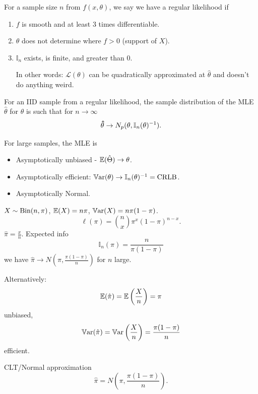 \documentclass[10pt, a4paper]{article}
\begin{document}
\begin{definition}
    For a sample size $n$ from $f(x, \theta)$,
    we say we have a regular likelihood if
    \begin{enumerate}[label = (\roman*)]
        \item $f$ is smooth and at least $3$ times differentiable.

        \item $\theta$ does not determine where $f > 0$
        (support of $X$).

        \item $\mathbb{I}_n$ exists,
        is finite,
        and greater than $0$.

        In other words:
        $\mathcal{L}(\theta)$ can be quadratically approximated at $\hat{\theta}$ and doesn't do anything weird.
    \end{enumerate}
\end{definition}

\begin{proposition}
    For an IID sample from a regular likelihood,
    the sample distribution of the MLE $\hat{\theta}$ for $\theta$ is such that for $n \to \infty$
    \[
    \mathbf{\hat{\theta}} \to N_p(\mathbf{\theta}, \mathbb{I}_n(\mathbf{\theta}) ^ {-1}).
    \]
\end{proposition}
For large samples,
the MLE is
\begin{itemize}
    \item Asymptotically unbiased -
    $\mathbb{E}(\hat{\Theta}) \to \theta$.

    \item Asymptotically efficient:
    $\mathbb{V}\mathrm{ar}(\theta) \to \mathbb{I}_n(\theta) ^ {-1} = \text{CRLB}$.

    \item Asymptotically Normal.
\end{itemize}

\begin{example}
    $X \sim \operatorname{Bin}(n, \pi)$,
    $\mathbb{E}(X) = n\pi$,
    $\mathbb{V}\mathrm{ar}(X) = n\pi(1 - \pi)$.
    \[
    \ell(\pi) = \binom{n}{x}\pi ^ x(1 - \pi) ^ {n - x}.
    \]
    $\hat{\pi} = \frac{x}{n}$.
    Expected info
    \[
    \mathbb{I}_n(\pi) = \frac{n}{\pi(1 - \pi)}
    \]
    we have $\hat{\pi} \to N\left(\pi, \frac{\pi(1 - \pi)}{n}\right)$ for $n$ large.

    Alternatively:
    \[
    \mathbb{E}(\hat{\pi}) = \mathbb{E}\left(\frac{X}{n}\right) = \pi
    \]
    unbiased,
    \[
    \mathbb{V}\mathrm{ar}(\hat{\pi}) = \mathbb{V}\mathrm{ar}\left(\frac{X}{n}\right) = \frac{\pi(1 - \pi)}{n}
    \]
    efficient.

    CLT/Normal approximation
    \[
    \hat{\pi} = N\left(\pi, \frac{\pi(1 - \pi)}{n}\right).
    \]
\end{example}
\end{document}
